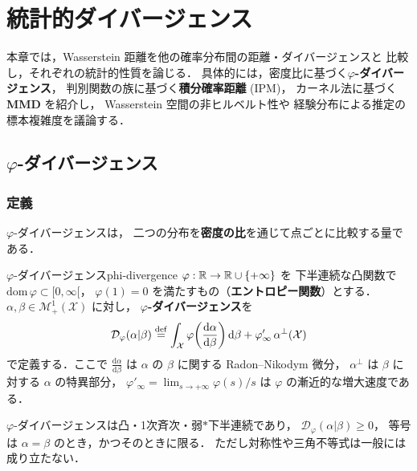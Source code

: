 
\chapter{統計的ダイバージェンス}\label{chap:divergences}

本章では，Wasserstein 距離を他の確率分布間の距離・ダイバージェンスと
比較し，それぞれの統計的性質を論じる．
具体的には，密度比に基づく\textbf{$\varphi$-ダイバージェンス}，
判別関数の族に基づく\textbf{積分確率距離} (IPM)，
カーネル法に基づく\textbf{MMD} を紹介し，
Wasserstein 空間の非ヒルベルト性や
経験分布による推定の標本複雑度を議論する．


\section{$\varphi$-ダイバージェンス}\label{sec:phi-div}

\subsection{定義}\label{subsec:phi-div-def}

$\varphi$-ダイバージェンスは，
二つの分布を\textbf{密度の比}を通じて点ごとに比較する量である．

\begin{definition}{$\varphi$-ダイバージェンス}{phi-divergence}
$\varphi : \mathbb{R} \to \mathbb{R} \cup \{+\infty\}$ を
下半連続な凸関数で $\mathrm{dom}\, \varphi \subset [0, \infty[$，
$\varphi(1) = 0$ を満たすもの（\textbf{エントロピー関数}）とする．
$\alpha, \beta \in \mathcal{M}^1_+(\mathcal{X})$ に対し，
\textbf{$\varphi$-ダイバージェンス}を
\begin{equation}\label{eq:phi-div}
  \mathcal{D}_\varphi(\alpha | \beta)
  \overset{\mathrm{def}}{=} \int_{\mathcal{X}} \varphi\!\left(\frac{\mathrm{d}\alpha}{\mathrm{d}\beta}\right)
  \mathrm{d}\beta
  + \varphi'_\infty\, \alpha^\perp(\mathcal{X})
\end{equation}
で定義する．ここで $\frac{\mathrm{d}\alpha}{\mathrm{d}\beta}$ は
$\alpha$ の $\beta$ に関する Radon--Nikodym 微分，
$\alpha^\perp$ は $\beta$ に対する $\alpha$ の特異部分，
$\varphi'_\infty = \lim_{s \to +\infty} \varphi(s)/s$ は
$\varphi$ の漸近的な増大速度である．
\end{definition}

$\varphi$-ダイバージェンスは凸・1次斉次・弱$*$下半連続であり，
$\mathcal{D}_\varphi(\alpha|\beta) \geq 0$，
等号は $\alpha = \beta$ のとき，かつそのときに限る．
ただし対称性や三角不等式は一般には成り立たない．

